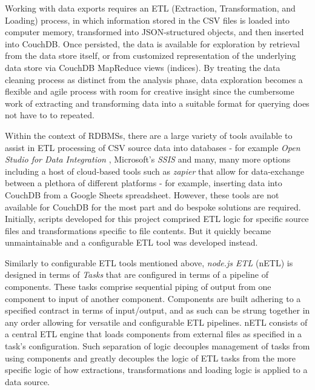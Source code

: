 Working with data exports requires an ETL (Extraction, Transformation, and Loading) process, in which information stored in the CSV files is loaded into computer memory, transformed into JSON-structured objects, and then inserted into CouchDB. Once persisted, the data is available for exploration by retrieval from the data store itself, or from customized representation of the underlying data store via CouchDB MapReduce views (indices). By treating the data cleaning process as distinct from the analysis phase, data exploration becomes a flexible and agile process with room for creative insight since the cumbersome work of extracting and transforming data into a suitable format for querying does not have to to repeated.

Within the context of RDBMSs, there are a large variety of tools available to assist in ETL processing of CSV source data into databases - for example \textit{Open Studio for Data Integration} \cite{talend}, Microsoft's \textit{SSIS} \cite{ssis} and many, many more options including a host of cloud-based tools such as \textit{zapier} \cite{zapier} that allow for data-exchange between a plethora of different platforms - for example, inserting data into CouchDB from a Google Sheets spreadsheet. However, these tools are not available for CouchDB for the most part and do bespoke solutions are required. Initially, scripts developed for this project comprised ETL logic for specific source files and transformations specific to file contents. But it quickly became unmaintainable and a configurable ETL tool was developed instead.

Similarly to configurable ETL tools mentioned above, \textit{node.js ETL} (nETL) is designed in terms of \textit{Tasks} that are configured in terms of a pipeline of components. These tasks comprise sequential piping of output from one component to input of another component. Components are built adhering to a specified contract in terms of input/output, and as such can be strung together in any order allowing for versatile and configurable ETL pipelines. nETL consists of a central ETL engine that loads components from external files as specified in a task's configuration. Such separation of logic decouples management of tasks from using components and greatly decouples the logic of ETL tasks from the more specific logic of how extractions, transformations and loading logic is applied to a data source.